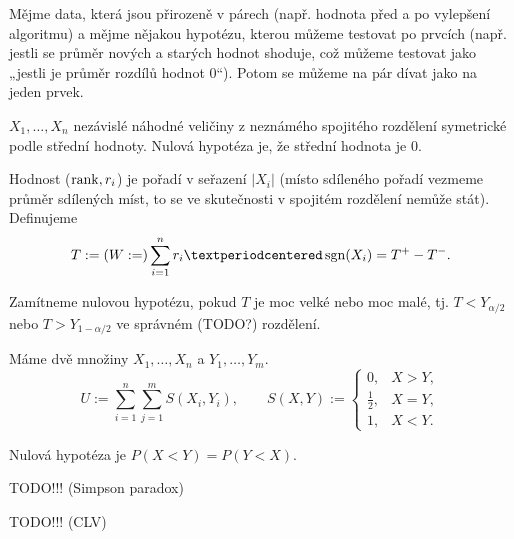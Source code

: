 \documentclass[12pt]{article}					%
\begin{document}
\begin{definice}
	Mějme data, která jsou přirozeně v párech (např. hodnota před a po vylepšení algoritmu) a mějme nějakou hypotézu, kterou můžeme testovat po prvcích (např. jestli se průměr nových a starých hodnot shoduje, což můžeme testovat jako „jestli je průměr rozdílů hodnot 0“). Potom se můžeme na pár dívat jako na jeden prvek.
\end{definice}

\begin{definice}
	$X_1, …, X_n$ nezávislé náhodné veličiny z neznámého spojitého rozdělení symetrické podle střední hodnoty. Nulová hypotéza je, že střední hodnota je 0.
	
	Hodnost ($\operatorname{rank}, r_i$) je pořadí v seřazení $|X_i|$ (místo sdíleného pořadí vezmeme průměr sdílených míst, to se ve skutečnosti v spojitém rozdělení nemůže stát). Definujeme
	$$ T := (W := ) \sum_{i=1}^n r_i·\sgn(X_i) = T^+ - T^-. $$

	Zamítneme nulovou hypotézu, pokud $T$ je moc velké nebo moc malé, tj. $T < Y_{\alpha / 2}$ nebo $T > Y_{1 - \alpha / 2}$ ve správném (TODO?) rozdělení.
\end{definice}

\begin{definice}
	Máme dvě množiny $X_1, …, X_n$ a $Y_1, …, Y_m$.
	$$ U := \sum_{i=1}^n \sum_{j=1}^m S(X_i, Y_i), \qquad S(X, Y) := \begin{cases}0, & X > Y,\\ \frac{1}{2}, & X = Y,\\ 1, & X < Y.\end{cases} $$

	Nulová hypotéza je $P(X < Y) = P(Y < X)$.
\end{definice}

TODO!!! (Simpson paradox) %

TODO!!! (CLV) %
\end{document}
